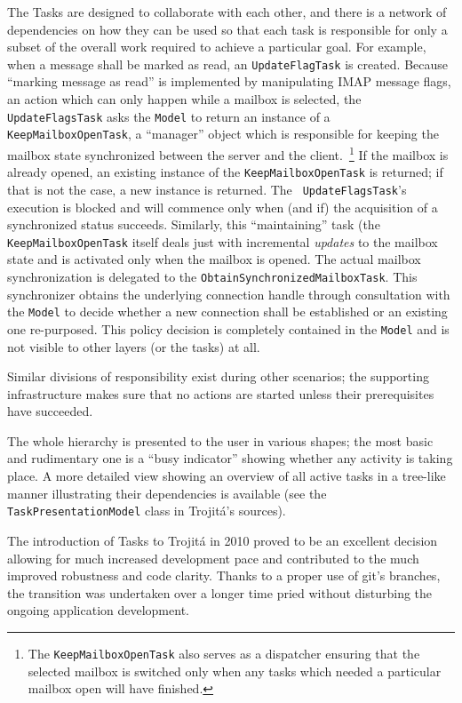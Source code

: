 \documentclass[trojita]{subfiles}
\begin{document}
The Tasks are designed to collaborate with each other, and there is a network of dependencies on how they can be used
so that each task is responsible for only a subset of the overall work required to achieve a particular goal.  For
example, when a message shall be marked as read, an {\tt UpdateFlagTask} is created.  Because ``marking message as
read'' is implemented by manipulating IMAP message flags, an action which can only happen while a mailbox is selected,
the {\tt UpdateFlagsTask} asks the {\tt Model} to return an instance of a {\tt KeepMailboxOpenTask}, a ``manager''
object which is responsible for keeping the mailbox state synchronized between the server and the client.~\footnote{The
{\tt KeepMailboxOpenTask} also serves as a dispatcher ensuring that the selected mailbox is switched only when any tasks
which needed a particular mailbox open will have finished.} If the mailbox is already opened, an existing instance of
the {\tt KeepMailboxOpenTask} is returned; if that is not the case, a new instance is returned.  The {\tt
UpdateFlagsTask}'s execution is blocked and will commence only when (and if) the acquisition of a synchronized status
succeeds.  Similarly, this ``maintaining'' task (the {\tt KeepMailboxOpenTask} itself deals just with incremental {\em
updates} to the mailbox state and is activated only when the mailbox is opened. The actual mailbox synchronization is
delegated to the {\tt ObtainSynchronizedMailboxTask}.  This synchronizer obtains the underlying connection handle
through consultation with the {\tt Model} to decide whether a new connection shall be established or an existing one
re-purposed.  This policy decision is completely contained in the {\tt Model} and is not visible to other layers (or the
tasks) at all.

Similar divisions of responsibility exist during other scenarios; the supporting infrastructure makes sure that no
actions are started unless their prerequisites have succeeded.

The whole hierarchy is presented to the user in various shapes; the most basic and rudimentary one is a ``busy
indicator'' showing whether any activity is taking place.  A more detailed view showing an overview of all active tasks
in a tree-like manner illustrating their dependencies is available (see the {\tt TaskPresentationModel} class in
Trojitá's sources).

The introduction of Tasks to Trojitá in 2010 proved to be an excellent decision allowing for much increased development
pace and contributed to the much improved robustness and code clarity.  Thanks to a proper use of git's branches, the
transition was undertaken over a longer time pried without disturbing the ongoing application development.
\end{document}
